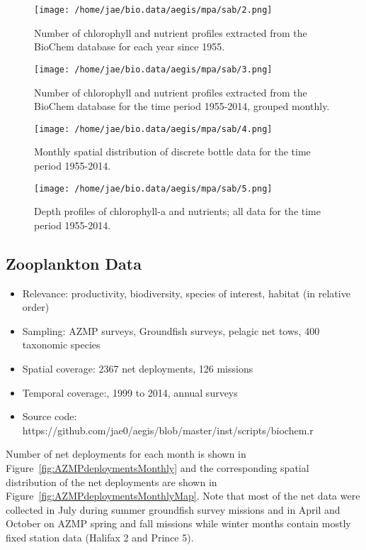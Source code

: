 \documentclass[letterpaper,portrait,11pt]{scrartcl}
\numberwithin{equation}{section}    %
\numberwithin{figure}{section}    %
\numberwithin{table}{section}       %
\begin{document}
\begin{figure}
  \centering
  \texttt{[image: /home/jae/bio.data/aegis/mpa/sab/2.png]}
  \caption{Number of chlorophyll and nutrient profiles extracted from the BioChem database for each year since 1955.}
  \label{fig:ChloroMap}
\end{figure}

\begin{figure}
  \centering
  \texttt{[image: /home/jae/bio.data/aegis/mpa/sab/3.png]}
  \caption{Number of chlorophyll and nutrient profiles extracted from the BioChem database for the time period 1955-2014, grouped monthly.}
  \label{fig:ChloroFreq}
\end{figure}

\begin{figure}[h]
  \centering
  \texttt{[image: /home/jae/bio.data/aegis/mpa/sab/4.png]}
  \caption{Monthly spatial distribution of discrete bottle data for the time period 1955-2014.}
  \label{fig:BottleMap}
\end{figure}

\begin{figure}
  \centering
  \texttt{[image: /home/jae/bio.data/aegis/mpa/sab/5.png]}
  \caption{Depth profiles of chlorophyll-a and nutrients; all data for the time period 1955-2014.}
  \label{fig:ChloroProfiles}
\end{figure}


\subsection{Zooplankton Data}

\begin{itemize}
  \item Relevance:  productivity, biodiversity, species of interest, habitat (in relative order)
  \item Sampling:  AZMP surveys, Groundfish surveys, pelagic net tows, 400 taxonomic species
  \item Spatial coverage: 2367 net deployments, 126 missions
  \item Temporal coverage:,  1999 to 2014, annual surveys
  \item Source code: https://github.com/jae0/aegis/blob/master/inst/scripts/biochem.r
\end{itemize}

Number of net deployments for each month is shown in Figure~\ref{fig:AZMPdeploymentsMonthly} and the corresponding spatial distribution of the net deployments are shown in Figure~\ref{fig:AZMPdeploymentsMonthlyMap}. Note that most of the net data were collected in July during summer groundfish survey missions and in April and October on AZMP spring and fall missions while winter months contain mostly fixed station data (Halifax 2 and Prince 5).
\end{document}
